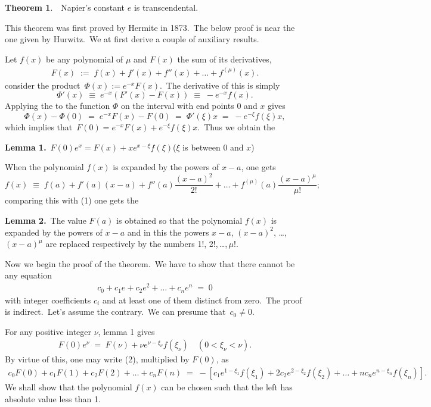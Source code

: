 \documentclass[12pt]{article}
\theoremstyle{definition}
\newtheorem*{thmplain}{Theorem}
\begin{document}
\begin{thmplain}
\,\, Napier's constant $e$ is transcendental.
\end{thmplain}

This theorem was first proved by Hermite in 1873.\, The below proof is near the one given by Hurwitz.\, We at first derive a couple of auxiliary results.

Let $f(x)$ be any polynomial of  $\mu$ and $F(x)$ the sum of its derivatives,
\begin{align}
F(x) \;:=\; f(x)+f'(x)+f''(x)+\ldots+f^{(\mu)}(x).
\end{align}
consider the product\, $\Phi(x) := e^{-x}F(x)$.\, The derivative of this is simply
$$\Phi'(x) \;\equiv\; e^{-x}(F'(x)-F(x)) \;\equiv\; -e^{-x}f(x).$$
Applying the  to the function $\Phi$ on the interval with end points 0 and $x$ gives
$$\Phi(x)-\Phi(0) \;=\; e^{-x}F(x)-F(0) \;=\; \Phi'(\xi)x \;=\; -e^{-\xi}f(\xi)x,$$
which implies that\, $F(0) = e^{-x}F(x)+e^{-\xi}f(\xi)x$.\, Thus we obtain the

\textbf{Lemma 1.}\, $F(0)e^x = F(x)+xe^{x-\xi}f(\xi)$\quad ($\xi$ is between 0 and $x$)

When the polynomial $f(x)$ is expanded by the powers of $x\!-\!a$, one gets
$$f(x) \;\equiv\; f(a)+f'(a)(x\!-\!a)+f''(a)\frac{(x\!-\!a)^2}{2!}+\ldots+
f^{(\mu)}(a)\frac{(x\!-\!a)^{\mu}}{\mu!};$$
comparing this with (1) one gets the 

\textbf{Lemma 2.}\, The value $F(a)$ is obtained so that the polynomial $f(x)$ is expanded by the powers of $x\!-\!a$ and in this  the powers $x\!-\!a$, $(x\!-\!a)^2$, \ldots, $(x\!-\!a)^{\mu}$ are replaced respectively by the numbers 1!, 2!,\,\ldots,\,$\mu!$.

Now we begin the proof of the theorem.\, We have to show that there cannot be any equation
\begin{align}
c_0+c_1e+c_2e^2+\ldots+c_ne^n \;=\; 0
\end{align}
with integer coefficients $c_i$ and at least one of them distinct from zero.\, The proof is indirect.\, Let's assume the contrary.\, We can presume that\, $c_0 \neq 0$.

For any positive integer $\nu$, lemma 1 gives
\begin{align}
F(0)e^{\nu} \;=\; F(\nu)+\nu e^{\nu-\xi_{\nu}}f(\xi_{\nu})
\quad(0 < \xi_{\nu} < \nu).
\end{align}
By virtue of this, one may write (2), multiplied by $F(0)$, as
\begin{align}
c_0F(0)\!+\!c_1F(1)\!+\!c_2F(2)\!+\!\ldots\!+\!c_nF(n) \;=\;
-[c_1e^{1-\xi_1}f(\xi_1)\!+\!2c_2e^{2-\xi_2}f(\xi_2)\!+\ldots+nc_ne^{n-\xi_n}f(\xi_n)].
\end{align}
We shall show that the polynomial $f(x)$ can be chosen such that the left  has absolute value less than 1.
\end{document}
